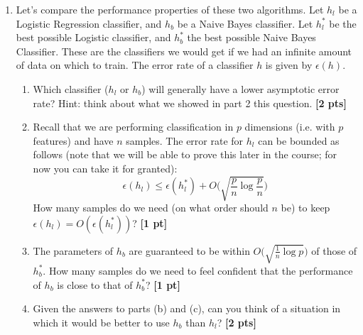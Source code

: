 \begin{enumerate}
\begin{enumerate}
	\item 
	Prove that we can write the Naive Bayes class distribution $P(Y = 1\mid X_,\hdots,X_p)$ in a form that matches the Logistic class distribution. To start, it will help to write $P(X_j = 1\mid Y = 1) = \theta_{j}$. Hint: this makes $P(X_j = x\mid Y=1) = \theta_{j}^{x}(1 - \theta_{j})^{x}$.
	{\bf {\bf [4 pts]}}
	\item 
	Show that Logistic Regression is the discriminative version of Naive Bayes. Hint: what happens when you optimize the conditional likelihood you derived in the previous part? 
	{\bf {\bf [2 pts]}}
	\item 
	The classifier we learn by optimizing the Naive Bayes conditional likelihood is nevertheless not the same as what we would have learned had we learned a Logistic classifier directly. What modeling assumption makes it somewhat less generic than Logistic Regression?
	{\bf [2 pt]}
	\item 
	Under what circumstances would Naive Bayes and Logistic Regression produce (asymptotically) the same classifier?
	{\bf [2 pt]}
	\end{enumerate}
			\item
Let's compare the performance properties of these two algorithms. Let $h_l$ be a Logistic Regression classifier, and $h_b$ be a Naive Bayes classifier. Let $h_l^*$ be the best possible Logistic classifier, and $h_b^*$ the best possible Naive Bayes Classifier. These are the classifiers we would get if we had an infinite amount of data on which to train. The error rate of a classifier $h$ is given by $\epsilon(h)$.
	\begin{enumerate}
	\item 
	Which classifier ($h_l$ or $h_b$) will generally have a lower asymptotic error rate? Hint: think about what we showed in part 2 this question.
	{\bf [2 pts]}
	\item 
	Recall that we are performing classification in $p$ dimensions (i.e. with $p$ features) and have $n$ samples. The error rate for $h_l$ can be bounded as follows (note that we will be able to prove this later in the course; for now you can take it for granted):
	\[\epsilon(h_l) \leq \epsilon(h_l^*) + O\bigg(\sqrt{\frac{p}{n}\log\frac{p}{n}}\bigg)\]
	How many samples do we need (on what order should $n$ be) to keep $\epsilon(h_l) = O(\epsilon(h_l^*))$? 
	{\bf [1 pt]}
	\item 
	The parameters of $h_b$ are guaranteed to be within $O\bigg(\sqrt{\frac{1}{n}\log p}\bigg)$ of those of $h_b^*$. How many samples do we need to feel confident that the performance of $h_b$ is close to that of $h_b^*$?
	{\bf [1 pt]}
	\item 
	Given the answers to parts (b) and (c), can you think of a situation in which it would be better to use $h_b$ than $h_l$?
	{\bf [2 pts]} \\\\
	\end{enumerate}
\end{enumerate}
